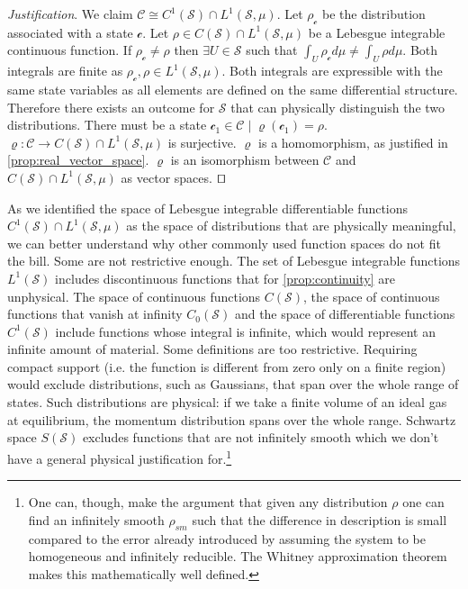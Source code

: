 \documentclass[smallextended]{svjour3}
\numberwithin{equation}{section}
\newenvironment{justification}{\emph{Justification}.}{\hfill\(\qed\)}
\theoremstyle{definition}
\newenvironment{justification}{\emph{Justification}.}{\qed}
\begin{document}
\begin{justification}
	We claim $\mathcal{C} \cong C^1(\mathcal{S}) \cap L^1(\mathcal{S}, \mu)$. Let $\rho_\mathcal{c}$ be the distribution associated with a state $\mathcal{c}$. Let $\rho \in C(\mathcal{S}) \cap  L^1(\mathcal{S}, \mu)$ be a Lebesgue integrable continuous function. If $\rho_\mathcal{c} \neq \rho$ then $\exists U \in \mathcal{S}$ such that $\int_{U} \rho_\mathcal{c} d \mu \neq \int_{U} \rho d \mu$. Both integrals are finite as $\rho_\mathcal{c}, \rho \in L^1(\mathcal{S}, \mu)$. Both integrals are expressible with the same state variables as all elements are defined on the same differential structure. Therefore there exists an outcome for $\mathcal{S}$ that can physically distinguish the two distributions. There must be a state $\mathcal{c}_1 \in \mathcal{C} \; | \; \varrho(\mathcal{c}_1)=\rho$. $\varrho : \mathcal{C} \rightarrow C(\mathcal{S}) \cap  L^1(\mathcal{S}, \mu)$ is surjective. $\varrho$ is a homomorphism, as justified in \ref{prop:real_vector_space}. $\varrho$ is an isomorphism between $\mathcal{C}$ and $C(\mathcal{S}) \cap  L^1(\mathcal{S}, \mu)$ as vector spaces.
\end{justification}

As we identified the space of Lebesgue integrable differentiable functions $C^1(\mathcal{S}) \cap  L^1(\mathcal{S}, \mu)$ as the space of distributions that are physically meaningful, we can better understand why other commonly used function spaces do not fit the bill. Some are not restrictive enough. The set of Lebesgue integrable functions $L^1(\mathcal{S})$ includes discontinuous functions that for \ref{prop:continuity} are unphysical. The space of continuous functions $C(\mathcal{S})$, the space of continuous functions that vanish at infinity $C_0(\mathcal{S})$ and the space of differentiable functions $C^1(\mathcal{S})$ include functions whose integral is infinite, which would represent an infinite amount of material. Some definitions are too restrictive. Requiring compact support (i.e. the function is different from zero only on a finite region) would exclude distributions, such as Gaussians, that span over the whole range of states. Such distributions are physical: if we take a finite volume of an ideal gas at equilibrium, the momentum distribution spans over the whole range. Schwartz space $S(\mathcal{S})$ excludes functions that are not infinitely smooth which we don't have a general physical justification for.\footnote{One can, though, make the argument that given any distribution $\rho$ one can find an infinitely smooth $\rho_{sm}$ such that the difference in description is small compared to the error already introduced by assuming the system to be homogeneous and infinitely reducible. The Whitney approximation theorem~\cite{Lee} makes this mathematically well defined.}
\end{document}
